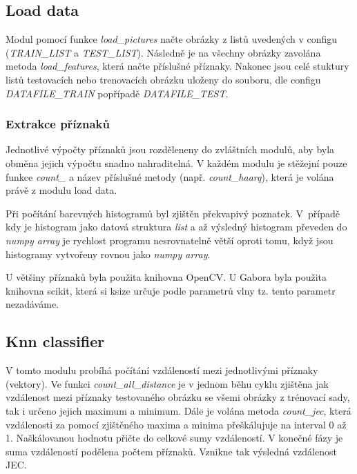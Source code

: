 \documentclass[czech,BP]{thesiskiv}
\begin{document}
\subsection{Load data}
\par Modul pomocí funkce \textit{load\_pictures} načte obrázky z listů uvedených v configu (\textit{TRAIN\_LIST} a \textit{TEST\_LIST}). Následně je na všechny obrázky zavolána metoda \textit{load\_features}, která načte příslušné příznaky. Nakonec jsou celé stuktury listů testovacích nebo trenovacích obrázku uloženy do souboru, dle configu \textit{DATAFILE\_TRAIN} popřípadě \textit{DATAFILE\_TEST}.


\subsubsection{Extrakce příznaků}
\par Jednotlivé výpočty příznaků jsou rozděleneny do zvláštních modulů, aby byla obměna jejich výpočtu snadno nahraditelná. V každém modulu je stěžejní pouze funkce \textit{count\_} a název příslušné metody (např. \textit{count\_haarq}), která je volána právě z modulu load data.

\par Při počítání barevných histogramů byl zjištěn překvapivý poznatek. V~případě kdy je histogram jako datová struktura \textit{list} a až výsledný histogram převeden do \textit{numpy array} je rychlost programu nesrovnatelně větší oproti tomu, když jsou histogramy vytvořeny rovnou jako \textit{numpy array}.  

\par U většiny příznaků byla použita knihovna OpenCV. U Gabora byla použita knihovna scikit, která si ksize určuje podle parametrů vlny tz. tento parametr nezadáváme.
  
  
\subsection{Knn classifier}
\par V tomto modulu probíhá počítání vzdáleností mezi jednotlivými příznaky (vektory). Ve funkci \textit{count\_all\_distance} je v jednom běhu cyklu zjištěna jak vzdálenost mezi příznaky testovaného obrázku se všemi obrázky z trénovací sady, tak i určeno jejich maximum a minimum. Dále je volána metoda \textit{count\_jec}, která vzdálenosti za pomocí zjištěného maxima a minima přeškálujuje na interval 0 až 1. Naškálovanou hodnotu přičte do celkové sumy vzdáleností. V konečné fázy je suma vzdáleností podělena počtem příznaků. Vznikne tak výsledná vzdálenost JEC.
    
\end{document}
